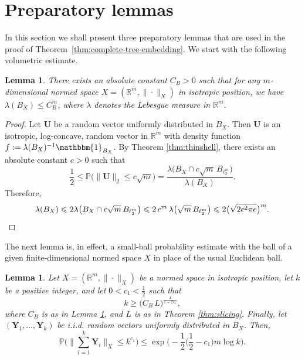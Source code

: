\documentclass[11pt,leqno]{amsart}
\newtheorem{lemma}[theorem]{Lemma}
\theoremstyle{remark}
\theoremstyle{plain}
\begin{document}
\section{Preparatory lemmas} \label{sec3}

In this section we shall present three preparatory lemmas that are used in the proof of Theorem~\ref{thm:complete-tree-embedding}. We start with the following volumetric estimate.

\begin{lemma} \label{lem:ball_volume}
There exists an absolute constant $C_B>0$ such that for any $m$-dimensional normed space $X=(\mathbb{R}^m,\|\cdot\|_X)$ in isotropic position, we have $\lambda(B_X)\leqslant C_B^m$, where $\lambda$ denotes the Lebesgue measure in $\mathbb{R}^m$.
\end{lemma}
\begin{proof}
Let $\mathbf{U}$ be a random vector uniformly distributed in $B_X$. Then $\mathbf{U}$ is an isotropic, log-concave, random vector in $\mathbb{R}^m$ with density function $f := \lambda(B_X)^{-1}\mathbbm{1}_{B_X}$. By Theorem \ref{thm:thinshell}, there exists an absolute constant $c>0$ such that
\[ \frac{1}{2}\leqslant \mathbb{P}\big( \|\mathbf{U}\|_2\leqslant c\sqrt{m}\big) =
\frac{\lambda\big(B_X\cap c\sqrt{m}\,B_{\ell^m_2}\big)}{\lambda(B_X)}. \]
Therefore,
\[ \lambda(B_X) \leqslant 2\lambda\big(B_X\cap c\sqrt{m}\, B_{\ell^m_2}\big) \leqslant
2\, c^m\, \lambda\big(\sqrt{m}\, B_{\ell^m_2}\big) \leqslant 2 \big(\sqrt{2c^2\pi e}\big)^m. \qedhere \]
\end{proof}

The next lemma is, in effect, a small-ball probability estimate with the ball of a given finite-dimensional normed space $X$ in place of the usual Euclidean ball.

\begin{lemma} \label{lem:prob_bound_1}
Let $X=(\mathbb{R}^m,\|\cdot\|_X)$ be a normed space in isotropic position, let $k$ be a positive integer, and let $0<c_1<\frac{1}{2}$ such that
\begin{equation} \label{eq:004}
k\geqslant \big(C_B\,L\big)^{\frac{4}{1-2c_1}},
\end{equation}
where $C_B$ is as in Lemma \ref{lem:ball_volume}, and $L$ is as in Theorem \ref{thm:slicing}. Finally, let $(\mathbf{Y}_1,\dots,\mathbf{Y}_k)$ be i.i.d. random vectors uniformly distributed in $B_X$. Then,
\begin{equation} \label{eq3.1}
\mathbb{P} \Bigg( \Big\|  \sum_{i=1}^{k} \mathbf{Y}_i \Big\|_X \leqslant k^{c_1} \Bigg)
\leqslant \exp\Big(-\frac{1}{2} \Big(\frac{1}{2}-c_1\Big) m \log k \Bigg).
\end{equation}
\end{lemma}
\end{document}
